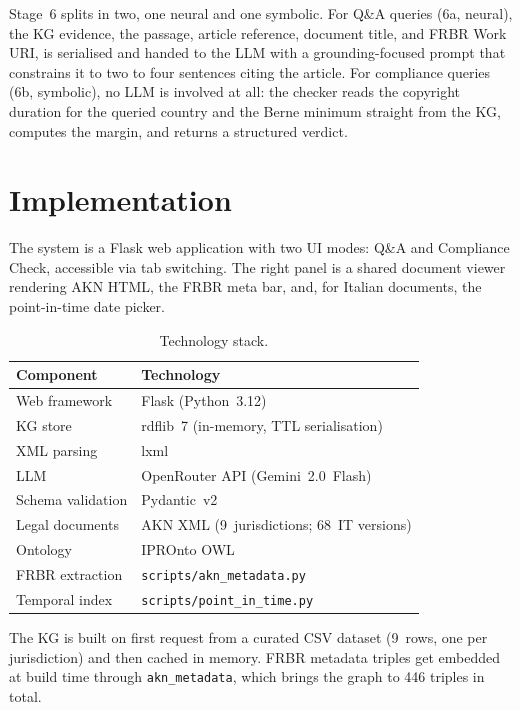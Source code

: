 \documentclass[12pt,a4paper]{article}
\begin{document}
Stage~6 splits in two, one neural and one symbolic. For Q\&A queries (6a,
neural), the KG evidence, the passage, article reference, document title,
and FRBR Work URI, is serialised and handed to the LLM with a
grounding-focused prompt that constrains it to two to four sentences citing
the article. For compliance queries (6b, symbolic), no LLM is involved at
all: the checker reads the copyright duration for the queried country and
the Berne minimum straight from the KG, computes the margin, and returns a
structured verdict.

\section{Implementation}

The system is a Flask web application with two UI modes: Q\&A and
Compliance Check, accessible via tab switching. The right panel is a
shared document viewer rendering AKN HTML, the FRBR meta bar, and, for
Italian documents, the point-in-time date picker.

\begin{table}[H]
\centering
\caption{Technology stack.}
\label{tab:stack}
\begin{tabularx}{\textwidth}{lX}
\toprule
\textbf{Component} & \textbf{Technology} \\
\midrule
Web framework      & Flask (Python~3.12) \\
KG store           & rdflib~7 (in-memory, TTL serialisation) \\
XML parsing        & lxml \\
LLM                & OpenRouter API (Gemini~2.0~Flash) \\
Schema validation  & Pydantic~v2 \\
Legal documents    & AKN XML (9~jurisdictions; 68~IT versions) \\
Ontology           & IPROnto OWL~\cite{delgado2003} \\
FRBR extraction    & \texttt{scripts/akn\_metadata.py} \\
Temporal index     & \texttt{scripts/point\_in\_time.py} \\
\bottomrule
\end{tabularx}
\end{table}

The KG is built on first request from a curated CSV dataset (9~rows, one
per jurisdiction) and then cached in memory. FRBR metadata triples get
embedded at build time through \texttt{akn\_metadata}, which brings the
graph to 446 triples in total.
\end{document}
